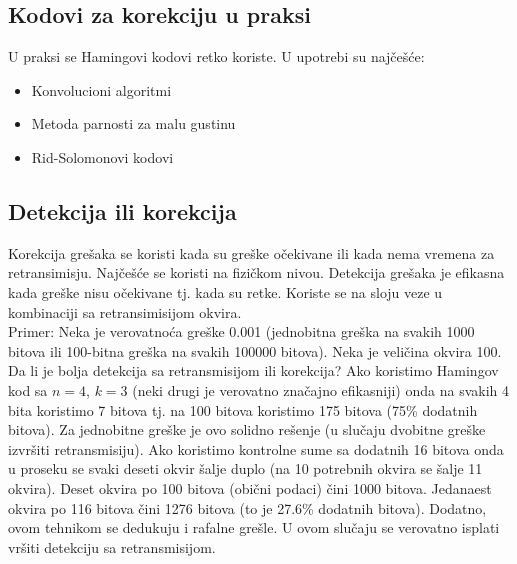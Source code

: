 \documentclass[a4paper]{article}
\begin{document}
    \subsection{Kodovi za korekciju u praksi}
        \noindent U praksi se Hamingovi kodovi retko koriste. U upotrebi su najčešće:
        \begin{itemize}
            \item Konvolucioni algoritmi
            \item Metoda parnosti za malu gustinu
            \item Rid-Solomonovi kodovi
        \end{itemize}
    
    \subsection{Detekcija ili korekcija}
        Korekcija grešaka se koristi kada su greške očekivane ili kada nema vremena za retransimisju.
        Najčešće se koristi na fizičkom nivou. Detekcija grešaka je efikasna kada greške nisu očekivane
        tj. kada su retke. Koriste se na sloju veze u kombinaciji sa retransimisijom okvira.\\
        
        Primer: Neka je verovatnoća greške 0.001 (jednobitna greška na svakih 1000 bitova ili 
        100-bitna greška na svakih 100000 bitova). Neka je veličina okvira 100. Da li je bolja
        detekcija sa retransmisijom ili korekcija? Ako koristimo Hamingov kod sa $n=4$, $k=3$ (neki drugi
        je verovatno značajno efikasniji) onda na svakih 4 bita koristimo 7 bitova tj. na 100 bitova
        koristimo 175 bitova (75\% dodatnih bitova). Za jednobitne greške je ovo solidno rešenje (u 
        slučaju dvobitne greške izvršiti retransmisiju). Ako koristimo kontrolne sume sa dodatnih 16 bitova
        onda u proseku se svaki deseti okvir šalje duplo (na 10 potrebnih okvira se šalje 11 okvira).
        Deset okvira po 100 bitova (obični podaci) čini 1000 bitova. Jedanaest okvira po 116 bitova
        čini 1276 bitova (to je 27.6\% dodatnih bitova). Dodatno, ovom tehnikom se dedukuju i rafalne
        grešle. U ovom slučaju se verovatno isplati vršiti detekciju sa retransmisijom. 
\end{document}
